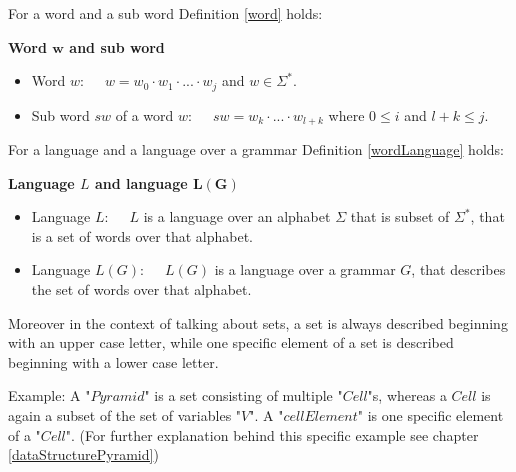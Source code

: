 For a word and a sub word Definition \ref{word} holds:
\begin{DefGrey} \label{word} \textbf{Word $\mathbf{w}$ and sub word}
	\begin{itemize}[leftmargin=1cm]
		\item Word $w$:~~~$w = w_0\cdot w_1\cdot ...\cdot w_j$ and $w \in \Sigma^*$.
		\item Sub word $sw$ of a word $w$:~~~$sw = w_k\cdot ...\cdot w_{l+k}$ where $0\leq i$ and $l+k \leq j$.
	\end{itemize}
\end{DefGrey}
\noindent For a language and a language over a grammar Definition \ref{wordLanguage} holds:
\begin{DefGrey}\label{wordLanguage} \textbf{Language $L$ and language $\mathbf{L(G)}$}~
	\begin{itemize}[leftmargin=1cm]
		\item Language $L$:~~~$L$ is a language over an alphabet $\Sigma$ that is subset of $\Sigma^*$, that is a set of words over that alphabet. 
		\item Language $L(G)$:~~~$L(G)$ is a language over a grammar $G$, that describes the set of words over that alphabet.
	\end{itemize}
\end{DefGrey}
\noindent Moreover in the context of talking about sets, a set is always described beginning with an upper case letter, while one specific element of a set is described beginning with a lower case letter. \\
\begin{testexample}
	Example: A "$Pyramid$" is a set consisting of multiple "$Cell$"s, whereas a $Cell$ is again a subset of the set of variables "$V$". A "$cellElement$" is one specific element of a "$Cell$". (For further explanation behind this specific example see chapter \ref{dataStructurePyramid})
\end{testexample}~\\


\pagebreak
